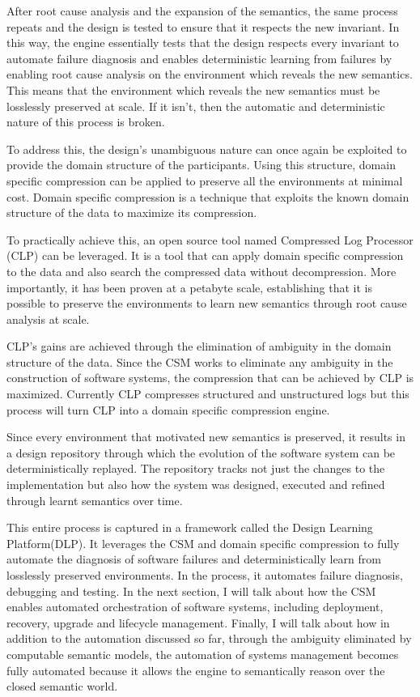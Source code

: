 \documentclass{article}
\begin{document}
After root cause analysis and the expansion of the semantics, the same process repeats and the design is tested to ensure that it respects the new invariant. In this way, the engine essentially tests that the design respects every invariant to automate failure diagnosis and enables deterministic learning from failures by enabling root cause analysis on the environment which reveals the new semantics. This means that the environment which reveals the new semantics must be losslessly preserved at scale. If it isn't, then the automatic and deterministic nature of this process is broken.

To address this, the design's unambiguous nature can once again be exploited to provide the domain structure of the participants. Using this structure, domain specific compression can be applied to preserve all the environments at minimal cost. Domain specific compression is a technique that exploits the known domain structure of the data to maximize its compression.

To practically achieve this, an open source tool named Compressed Log Processor (CLP) can be leveraged. It is a tool that can apply domain specific compression to the data and also search the compressed data without decompression. More importantly, it has been proven at a petabyte scale, establishing that it is possible to preserve the environments to learn new semantics through root cause analysis at scale.

CLP’s gains are achieved through the elimination of ambiguity in the domain structure of the data. Since the CSM works to eliminate any ambiguity in the construction of software systems, the compression that can be achieved by CLP is maximized. Currently CLP compresses structured and unstructured logs but this process will turn CLP into a domain specific compression engine.

Since every environment that motivated new semantics is preserved, it results in a design repository through which the evolution of the software system can be deterministically replayed. The repository tracks not just the changes to the implementation but also how the system was designed, executed and refined through learnt semantics over time.

This entire process is captured in a framework called the Design Learning Platform(DLP). It leverages the CSM and domain specific compression to fully automate the diagnosis of software failures and deterministically learn from losslessly preserved environments. In the process, it automates failure diagnosis, debugging and testing.
In the next section, I will talk about how the CSM enables automated orchestration of software systems, including deployment, recovery, upgrade and lifecycle management. Finally, I will talk about how in addition to the automation discussed so far, through the ambiguity eliminated by computable semantic models, the automation of systems management becomes fully automated because it allows the engine to semantically reason over the closed semantic world.
\end{document}
